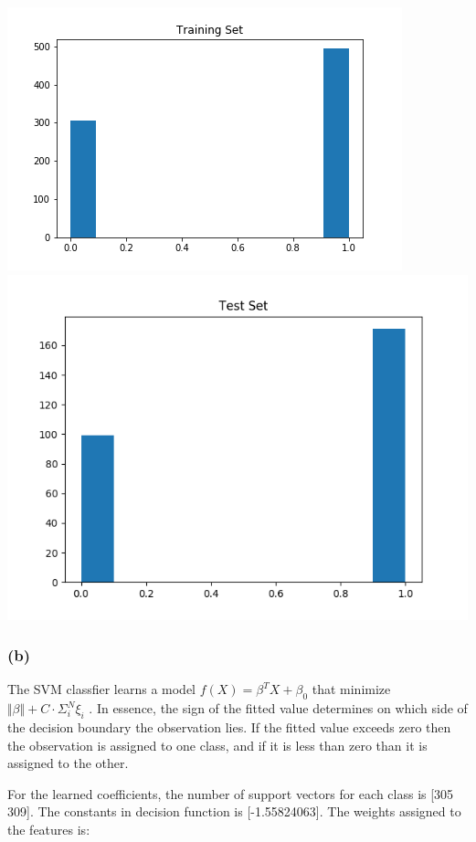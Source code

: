 \documentclass[12pt]{article}
\begin{document}
{\begin{center}
\includegraphics[scale=0.5]{P2/3a_class_fraction_training.png}
\includegraphics[scale=0.5]{P2/3a_class_fraction_test.png}
\end{center}


\subsubsection*{(b)}
The SVM classfier learns a model $ f(X)= \beta^T X + \beta_0 $ that minimize $\Vert \beta \Vert + C\cdot\Sigma_i^{N} \xi_i $ . In essence, the sign of the fitted value determines on which side of the decision boundary the observation lies. If the fitted value exceeds zero then the observation is assigned to one class, and if it is less than zero than it is assigned to the other. 

For the learned coefficients, 
the number of support vectors for each class is [305 309].
 The constants in decision function is [-1.55824063]. The weights assigned to the features is: \newline
[ 0.00313619  0.10952847 -0.03483193  0.04412031  0.01375094 -0.16467846
   0.07207978 -0.27        1.01626556  0.20879877 -0.04858287  0.25738164
  -0.01682384 -0.07617903  0.00742896  0.07895224]
 
}
\end{document}
